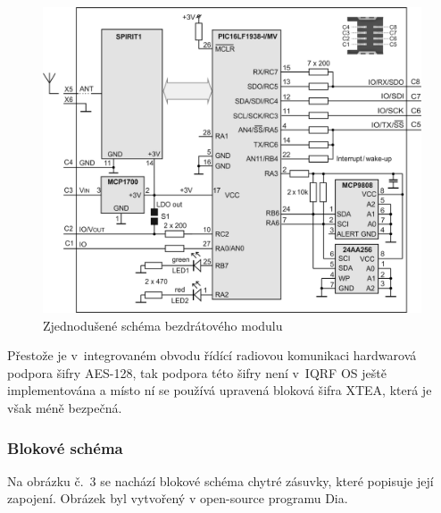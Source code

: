 \documentclass[12pt,a4paper,oneside]{article}
\begin{document}
\begin{figure}[H]
\centering
\label{fig:iqrf/zjednodusene-schema}
\includegraphics[width = 128mm]{img/iqrf-zjednodusene-schema.png}
\caption{Zjednodušené schéma bezdrátového modulu}
\end{figure}

Přestože je v~integrovaném obvodu řídící radiovou komunikaci hardwarová podpora šifry AES-128, tak podpora této šifry není v~IQRF OS ještě implementována a místo ní se používá upravená bloková šifra XTEA, která je však méně bezpečná.

\newpage

\subsubsection{Blokové schéma}

Na obrázku č.~3 se nachází blokové schéma chytré zásuvky, které popisuje její zapojení. Obrázek byl vytvořený v open-source programu Dia\cite{sw/dia}.
\end{document}
